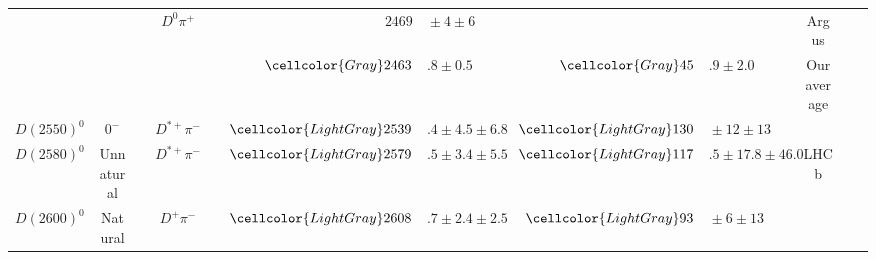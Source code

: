 \begin{adjustbox}{width=0.76\textwidth,center}
{\begin{tabular}{cp{5pt}cp{5pt}cp{5pt}r@{}lp{5pt}r@{}lp{5pt}cp{5pt}c}
		                                         &                  &                              &                  & $D^{0}\pi^{+}$                  &                       & $	2469$                       & ${}\pm4\pm6	$                                 &                       &                                                  &                                              &                       & Argus                                                         &                       & \cite{Albrecht:1988xx}                    \\ \cmidrule{6-14}
		                                         &                  &                              &                  &                                 & \cellcolor{Gray}      & $	\cellcolor{Gray} 2463$      & \cellcolor{Gray}$.8 \pm 0.5	$                 & \cellcolor{Gray}      & $	\cellcolor{Gray}45$                            & \cellcolor{Gray}$.9 \pm 2.0	$                & \cellcolor{Gray}      & \cellcolor{Gray} Our average                                  & \cellcolor{Gray}      &                                           \\ \midrule
		\multirow{1}{*}{$D(2550)^{0}$}           &                  & \multirow{1}{*}{$0^{-}$}     &                  & $D^{*+}\pi^{-}$                 & \cellcolor{LightGray} & $	\cellcolor{LightGray}2539$  & \cellcolor{LightGray}$.4\pm4.5\pm6.8	$        & \cellcolor{LightGray} & $	\cellcolor{LightGray}130$                      & \cellcolor{LightGray}${}\pm12\pm13	$         & \cellcolor{LightGray} & \cellcolor{LightGray} \babar{}                                & \cellcolor{LightGray} & \cite{delAmoSanchez:2010vq}               \\ \midrule
		\multirow{1}{*}{$D(2580)^{0}$}           &                  & \multirow{1}{*}{Unnatural}   &                  & $D^{*+}\pi^{-}$                 & \cellcolor{LightGray} & $	\cellcolor{LightGray}2579$  & \cellcolor{LightGray}$.5\pm3.4\pm5.5	$        & \cellcolor{LightGray} & $	\cellcolor{LightGray} 117$                     & \cellcolor{LightGray}$.5\pm17.8\pm46.0	$     & \cellcolor{LightGray} & \cellcolor{LightGray} LHCb                                    & \cellcolor{LightGray} & \cite{Aaij:2013sza}                       \\ \midrule
		\multirow{1}{*}{$D(2600)^{0}$}           &                  & \multirow{1}{*}{Natural}     &                  & $D^{+}\pi^{-}$                  & \cellcolor{LightGray} & $	\cellcolor{LightGray}2608$  & \cellcolor{LightGray}$.7\pm2.4\pm2.5	$        & \cellcolor{LightGray} & $	\cellcolor{LightGray} 93$                      & \cellcolor{LightGray}${}\pm6\pm13	$          & \cellcolor{LightGray} & \cellcolor{LightGray} \babar{}                                & \cellcolor{LightGray} & \cite{delAmoSanchez:2010vq}               \\ \midrule

\end{tabular}}
\end{adjustbox}
